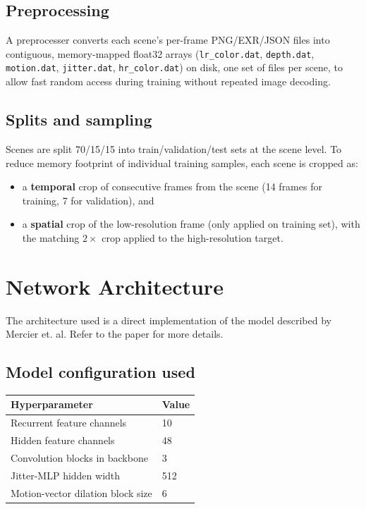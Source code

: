 \documentclass[11pt]{article}
\begin{document}
\subsection{Preprocessing}
A preprocesser converts each scene's per-frame PNG/EXR/JSON files into contiguous, memory-mapped float32 arrays (\texttt{lr\_color.dat}, \texttt{depth.dat}, \texttt{motion.dat}, \texttt{jitter.dat}, \texttt{hr\_color.dat}) on disk, one set of files per scene, to allow fast random access during training without repeated image decoding.

\subsection{Splits and sampling}
Scenes are split 70/15/15 into train/validation/test sets at the scene level. To reduce memory footprint of individual training samples, each scene is cropped as: 
\begin{itemize}[itemsep=2pt]
    \item a \textbf{temporal} crop of consecutive frames from the scene (14 frames for training, 7 for validation), and
    \item a \textbf{spatial} crop of the low-resolution frame (only applied on training set), with the matching $2\times$ crop applied to the high-resolution target.
\end{itemize}

\section{Network Architecture}

The architecture used is a direct implementation of the model described by Mercier et. al\cite{mercier2023}. Refer to the paper for more details.

\subsection{Model configuration used}
\begin{table}[H]
\centering
\begin{tabular}{ll}
\toprule
Hyperparameter & Value \\
\midrule
Recurrent feature channels & 10 \\
Hidden feature channels & 48 \\
Convolution blocks in backbone & 3 \\
Jitter-MLP hidden width & 512 \\
Motion-vector dilation block size & 6 \\
\bottomrule
\end{tabular}
\end{table}
\end{document}
